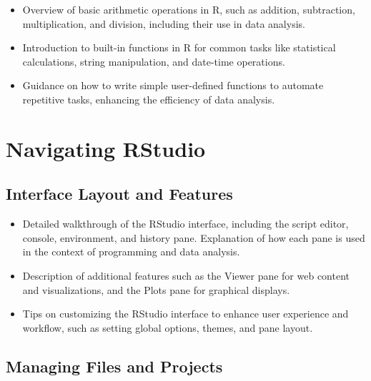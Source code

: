 \documentclass[
]{book}
\begin{document}
\begin{itemize}
\item
  Overview of basic arithmetic operations in R, such as addition, subtraction, multiplication, and division, including their use in data analysis.
\item
  Introduction to built-in functions in R for common tasks like statistical calculations, string manipulation, and date-time operations.
\item
  Guidance on how to write simple user-defined functions to automate repetitive tasks, enhancing the efficiency of data analysis.
\end{itemize}

\hypertarget{navigating-rstudio}{%
\section*{Navigating RStudio}\label{navigating-rstudio}}

\hypertarget{interface-layout-and-features}{%
\subsection*{Interface Layout and Features}\label{interface-layout-and-features}}

\begin{itemize}
\item
  Detailed walkthrough of the RStudio interface, including the script editor, console, environment, and history pane. Explanation of how each pane is used in the context of programming and data analysis.
\item
  Description of additional features such as the Viewer pane for web content and visualizations, and the Plots pane for graphical displays.
\item
  Tips on customizing the RStudio interface to enhance user experience and workflow, such as setting global options, themes, and pane layout.
\end{itemize}

\hypertarget{managing-files-and-projects}{%
\subsection*{Managing Files and Projects}\label{managing-files-and-projects}}
\end{document}
